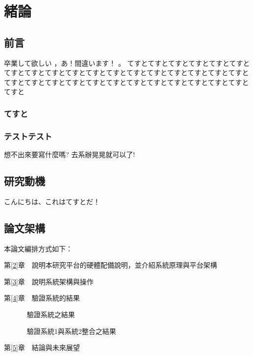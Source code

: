 
\chapter{緒論}\label{1}


\section{前言}\label{1-1}
卒業して欲しい \cite{m1} ，あ！間違います！ \cite{talbot97} 。
てすとてすとてすとてすとてすとてすとてすとてすとてすとてすとてすとてすとてすとてすとてすとてすとてすとてすとてすとてすとてすとてすとてすとてすとてすとてすとてすとてすとてすとてすとてすと

\subsection{てすと}


\subsection{テストテスト}
想不出來要寫什麼嗎?
去系辦晃晃就可以了!\cite{goossens97}

\newpage

\section{研究動機}\label{1-2}
こんにちは、これはてすとだ！

\newpage

\section{論文架構}\label{1-3}

\n 本論文編排方式如下：

第\ref{2}章　說明本研究平台的硬體配備說明，並介紹系統原理與平台架構

第\ref{3}章　說明系統架構與操作

第\ref{4}章　驗證系統的結果
		
　　　      驗證系統之結果

　　　      驗證系統1與系統2整合之結果

第\ref{5}章　結論與未來展望
